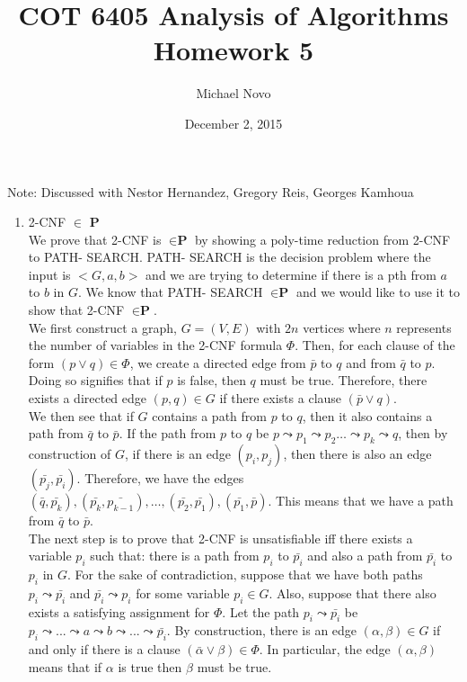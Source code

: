\documentclass[]{report}
\title{COT 6405 Analysis of Algorithms \\ Homework 5}
\author{Michael Novo}
\date{December 2, 2015}
\begin{document}
\maketitle

 Note: Discussed with Nestor Hernandez, Gregory Reis, Georges Kamhoua

\begin{enumerate}
	

	
	\item  2-CNF $\in$ \textbf{P} \\
	
	We prove that 2-CNF is $\in \textbf{P}$ by showing a poly-time reduction from 2-CNF to PATH- SEARCH. PATH- SEARCH is the decision problem where the input is $<G,a,b>$ and we are trying to determine if there is a pth from $a$  to $b$ in $G$. We know that PATH- SEARCH $\in \textbf{P}$ and we would like to use it to show that 2-CNF $\in \textbf{P}$. \\ 
	
	We first construct a graph, $G=(V,E)$  with $2n$ vertices where $n$ represents the number of variables in the 2-CNF formula $\Phi$. Then, for each clause of the form $(p\vee q) \in \Phi$, we create a directed edge from $\bar{p}$ to $q$ and from $\bar{q}$ to $p$. Doing so signifies that if $p$ is false, then $q$ must be true. Therefore, there exists a directed edge $(p,q) \in G$ if there exists a clause $(\bar{p} \vee q)$. \\
	
	We then see that if $G$ contains a path from $p$ to $q$, then it also contains a path from $\bar{q}$ to $\bar{p}$. If the path from $p$ to $q$ be 	$p\leadsto p_1 \leadsto p_2 \dots \leadsto p_k \leadsto q$, then by construction of $G$, if there is an edge $(p_i,p_j)$, then there is also an edge$(\bar{p_j},\bar{p_i})$. Therefore, we have the edges $(\bar{q},\bar{p_k}), (\bar{p_k}, \bar{p_{k-1}}), \dots, (\bar{p_2},\bar{p_1}), (\bar{p_1},\bar{p})$. This means that we have a path from $\bar{q}$ to $\bar{p}$. \\ 
	
	The next step is to prove that 2-CNF is unsatisfiable iff there exists a variable $p_i$ such that: there is a path from $p_i$ to $\bar{p_i}$ and also a path from $\bar{p_i}$ to $p_i$ in $G$. For the sake of contradiction, suppose that we have both paths $p_i \leadsto \bar{p_i}$ and $\bar{p_i} \leadsto p_i$ for some variable $p_i \in G$. Also, suppose that there also exists	a satisfying assignment for $\Phi$. Let the path $p_i \leadsto \bar{p_i}$ be $p_i \leadsto ... \leadsto a \leadsto b \leadsto ... \leadsto \bar{p_i}$. By construction, there is an edge $(\alpha, \beta) \in G$ if and only if there is a clause $(\bar{\alpha} \vee \beta) \in \Phi$. In particular, the edge $(\alpha, \beta)$ means that if $\alpha$ is true then $\beta$ must	be true. \\
	

\end{enumerate}
\end{document}
